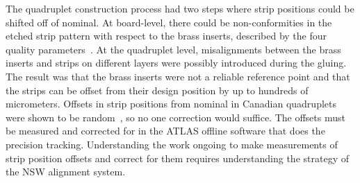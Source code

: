 
The quadruplet construction process had two steps where strip positions could be shifted off of nominal. At board-level, there could be non-conformities in the etched strip pattern with respect to the brass inserts, described by the four quality parameters~\cite{carlson_results_2019}. At the quadruplet level, misalignments between the brass inserts and strips on different layers were possibly introduced during the gluing. The result was that the brass inserts were not a reliable reference point and that the strips can be offset from their design position by up to hundreds of micrometers. Offsets in strip positions from nominal in Canadian quadruplets were shown to be random~\cite{carlson_results_2019}, so no one correction would suffice. The offsets must be measured and corrected for in the ATLAS offline software that does the precision tracking. Understanding the work ongoing to make measurements of strip position offsets and correct for them requires understanding the strategy of the NSW alignment system.



